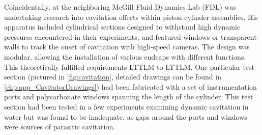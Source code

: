             Coincidentally, \textcite{kokkalisOnsetCavitationDynamically2023} at the neighboring McGill Fluid Dynamics Lab (FDL) was undertaking research into cavitation effects within piston-cylinder assemblies. His apparatus included cylindrical sections designed to withstand high dynamic pressures encountered in their experiments, and featured windows or transparent walls to track the onset of cavitation with high-speed cameras. The design was modular, allowing the installation of various endcaps with different functions. This theoretically fulfilled requirements LTTLM to LTTLM. One particular test section (pictured in \autoref{fig:cavitation}, detailed drawings can be found in \autoref{chp:app_CavitatorDrawings}) had been fabricated with a set of instrumentation ports and polycarbonate windows spanning the length of the cylinder. This test section had been tested in a few experiments examining dynamic cavitation in water but was found to be inadequate, as gaps around the ports and windows were sources of parasitic cavitation.

